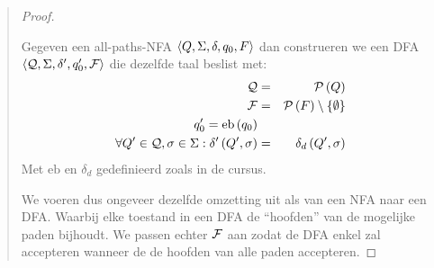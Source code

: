 \documentclass[a4paper]{article}
\begin{document}
\begin{question}
\begin{answer}
\begin{enumerate}
\begin{quotation}
\begin{proof}
\begin{construction}
Gegeven een all-paths-NFA $\left\langle Q,\Sigma,\delta,q_0,F \right\rangle$ dan construeren we een DFA $\left\langle \mathcal{Q},\Sigma,\delta',q_0',\mathcal{F} \right\rangle$ die dezelfde taal beslist met:
\begin{eqnarray}
\mathcal{Q}&=&\mathcal{P}\left( Q \right)\\
\mathcal{F}&=&\mathcal{P}\left( F \right)\setminus\left\{ \emptyset \right\}\\
q_0'=\mbox{eb}\left( q_0 \right)\\
\forall Q'\in \mathcal{Q},\sigma\in\Sigma:\delta'\left( Q',\sigma \right)&=&\delta_d\left( Q',\sigma \right)
\end{eqnarray}
Met $\mbox{eb}$ en $\delta_d$ gedefinieerd zoals in de cursus.
\end{construction}
We voeren dus ongeveer dezelfde omzetting uit als van een NFA naar een DFA. Waarbij elke toestand in een DFA de ``hoofden'' van de mogelijke paden bijhoudt. We passen echter $\mathcal{F}$ aan zodat de DFA enkel zal accepteren wanneer de de hoofden van alle paden accepteren.
\end{proof}
\end{quotation}
\end{enumerate}

\end{answer}
\end{question}
\end{document}
